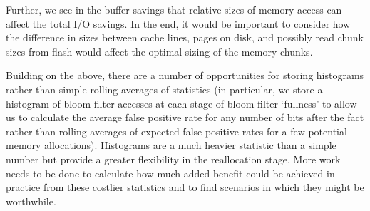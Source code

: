 \documentclass{sig-alternate-05-2015}
\begin{document}
Further, we see in the buffer savings that relative sizes of memory access can affect the total I/O savings. In the end, it would be important to consider how the difference in sizes between cache lines, pages on disk, and possibly read chunk sizes from flash would affect the optimal sizing of the memory chunks.

Building on the above, there are a number of opportunities for storing histograms rather than simple rolling averages of statistics (in particular, we store a histogram of bloom filter accesses at each stage of bloom filter `fullness' to allow us to calculate the average false positive rate for any number of bits after the fact rather than rolling averages of expected false positive rates for a few potential memory allocations). Histograms are a much heavier statistic than a simple number but provide a greater flexibility in the reallocation stage. More work needs to be done to calculate how much added benefit could be achieved in practice from these costlier statistics and to find scenarios in which they might be worthwhile.



\small

\end{document}
